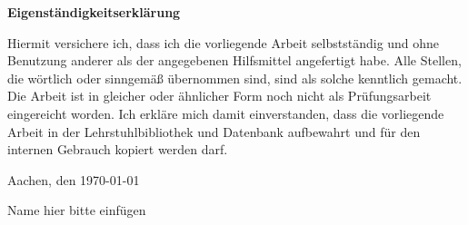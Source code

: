 \Large
\textsf{\textbf{Eigenständigkeitserklärung}}


\normalsize
\textsf{Hiermit versichere ich, dass ich die vorliegende Arbeit selbstständig und ohne Benutzung anderer als der angegebenen Hilfsmittel angefertigt habe. Alle Stellen, die wörtlich oder sinngemäß übernommen sind, sind als solche kenntlich gemacht. Die Arbeit ist in gleicher oder ähnlicher Form noch nicht als Prüfungsarbeit eingereicht worden. Ich erkläre mich damit einverstanden, dass die vorliegende Arbeit in der Lehrstuhlbibliothek und Datenbank aufbewahrt und für den internen Gebrauch kopiert werden darf.} \newline \newline


\textsf{Aachen, den \today \newline \newline}


\textsf{Name hier bitte einfügen}
